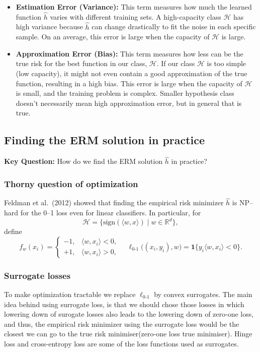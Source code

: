 \documentclass[11pt]{article}
\theoremstyle{plain} %
\begin{document}
\begin{itemize}
    \item \textbf{Estimation Error (Variance):} This term measures how much the learned function $\hat{h}$ varies with different training sets. A high-capacity class $\mathcal{H}$ has high variance because $\hat{h}$ can change drastically to fit the noise in each specific sample. On an average, this error is large when the capacity of $\mathcal{H}$ is large.
    
    \item \textbf{Approximation Error (Bias):} This term measures how less can be the true risk for the best function in our class, ${\mathcal{H}}$. If our class $\mathcal{H}$ is too simple (low capacity), it might not even contain a good approximation of the true function, resulting in a high bias. This error is large when the capacity of $\mathcal{H}$ is small, and the training problem is complex. Smaller hypothesis class doesn't necessarily mean high approximation error, but in general that is true.
\end{itemize}

\subsection{Finding the ERM solution in practice}
\textbf{Key Question:} How do we find the ERM solution \(\hat h\) in practice?

\subsubsection{Thorny question of optimization}
Feldman et al.\ (2012) showed that finding the empirical risk minimizer \(\hat h\) is NP–hard for the 0–1 loss even for linear classifiers.  In particular, for
\[
  \mathcal H=\bigl\{\mathrm{sign}(\langle w,x\rangle)\mid w\in\mathbb R^d\bigr\},
\]
define
\[
  f_w(x_i)=
  \begin{cases}
    -1, & \langle w,x_i\rangle<0,\\
    +1, & \langle w,x_i\rangle>0,
  \end{cases}
\quad
  \ell_{0\text{-}1}\bigl((x_i,y_i),w\bigr)
  =\mathbf1\{y_i\langle w,x_i\rangle<0\}.
\]

\subsubsection{Surrogate losses}
To make optimization tractable we replace \(\ell_{0\text{-}1}\) by convex surrogates. The main idea behind using surrogate loss, is that we should chose those losses in which lowering down of surogate losses also leads to the lowering down of zero-one loss, and thus, the empirical risk minimizer using the surrogate loss would be the closest we can go to the true risk minimiser(zero-one loss true minimiser).
Hinge loss and cross-entropy loss are some of the loss functions used as surrogates.
\end{document}
